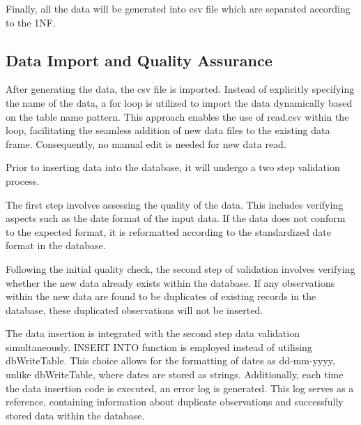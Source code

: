\documentclass[
  letterpaper,
  DIV=11,
  numbers=noendperiod]{scrartcl}
\begin{document}
Finally, all the data will be generated into csv file which are
separated according to the 1NF.

\hypertarget{data-import-and-quality-assurance}{%
\subsection{Data Import and Quality
Assurance}\label{data-import-and-quality-assurance}}

After generating the data, the csv file is imported. Instead of
explicitly specifying the name of the data, a for loop is utilized to
import the data dynamically based on the table name pattern. This
approach enables the use of read.csv within the loop, facilitating the
seamless addition of new data files to the existing data frame.
Consequently, no manual edit is needed for new data read.

Prior to inserting data into the database, it will undergo a two step
validation process.

The first step involves assessing the quality of the data. This includes
verifying aspects such as the date format of the input data. If the data
does not conform to the expected format, it is reformatted according to
the standardized date format in the database.

Following the initial quality check, the second step of validation
involves verifying whether the new data already exists within the
database. If any observations within the new data are found to be
duplicates of existing records in the database, these duplicated
observations will not be inserted.

The data insertion is integrated with the second step data validation
simultaneously. INSERT INTO function is employed instead of utilising
dbWriteTable. This choice allows for the formatting of dates as
dd-mm-yyyy, unlike dbWriteTable, where dates are stored as strings.
Additionally, each time the data insertion code is executed, an error
log is generated. This log serves as a reference, containing information
about duplicate observations and successfully stored data within the
database.
\end{document}
